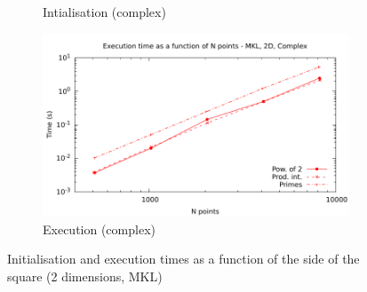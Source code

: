 \documentclass[12pt, a4paper]{article}
\begin{document}
\begin{figure}[H]
\begin{subfigure}{.5\textwidth}
\caption{Intialisation (complex)}
\label{2DMKLCI}
\end{subfigure}%
\begin{subfigure}{.5\textwidth}
\centering
\includegraphics[width=.9\linewidth]{graphs/2d-mkl-exec-c.pdf}
\caption{Execution (complex)}
\label{2DMKLC}
\end{subfigure}
\caption{Initialisation and execution times as a function of the side of the square (2 dimensions, MKL)}
\label{2DMKL}
\end{figure}
\end{document}
